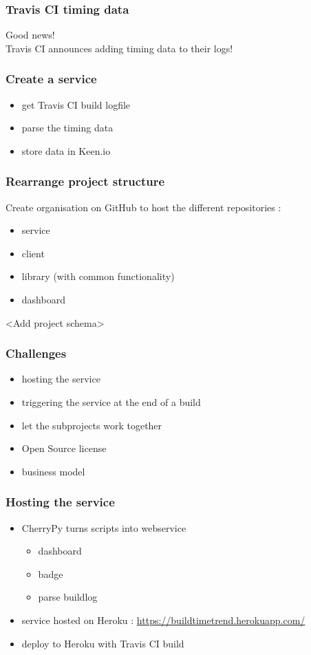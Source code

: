 \documentclass[14pt]{beamer}
\begin{document}
  \begin{frame}
    \frametitle{Travis CI timing data}
    Good news!\\
    Travis CI announces adding timing data to their logs!\\
  \end{frame}
  \begin{frame}
    \frametitle{Create a service}
    \begin{itemize}
      \item get Travis CI build logfile
      \item parse the timing data
      \item store data in Keen.io
    \end{itemize}
  \end{frame}
  \begin{frame}
    \frametitle{Rearrange project structure}
    Create organisation on GitHub to host the different repositories :
    \begin{itemize}
      \item service
      \item client
      \item library (with common functionality)
      \item dashboard
    \end{itemize}
    <Add project schema>
  \end{frame}
  \begin{frame}
    \frametitle{Challenges}
    \begin{itemize}
      \item hosting the service
      \item triggering the service at the end of a build
      \item let the subprojects work together
      \item Open Source license
      \item business model
    \end{itemize}
  \end{frame}
  \begin{frame}
    \frametitle{Hosting the service}
    \begin{itemize}
      \item CherryPy turns scripts into webservice
        \begin{itemize}
          \item dashboard
          \item badge
          \item parse buildlog
        \end{itemize}
      \item service hosted on Heroku : \href{https://buildtimetrend.herokuapp.com/}{https://buildtimetrend.herokuapp.com/}
      \item deploy to Heroku with Travis CI build
    \end{itemize}
  \end{frame}
\end{document}
